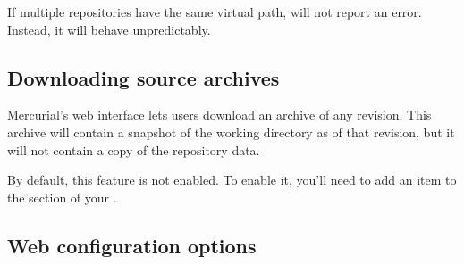 \begin{note}
  If multiple repositories have the same virtual path,
   will not report an error.  Instead, it will
  behave unpredictably.
\end{note}

\subsection{Downloading source archives}

Mercurial's web interface lets users download an archive of any
revision.  This archive will contain a snapshot of the working
directory as of that revision, but it will not contain a copy of the
repository data.

By default, this feature is not enabled.  To enable it, you'll need to
add an  item to the 
section of your \hgrc.

\subsection{Web configuration options}

